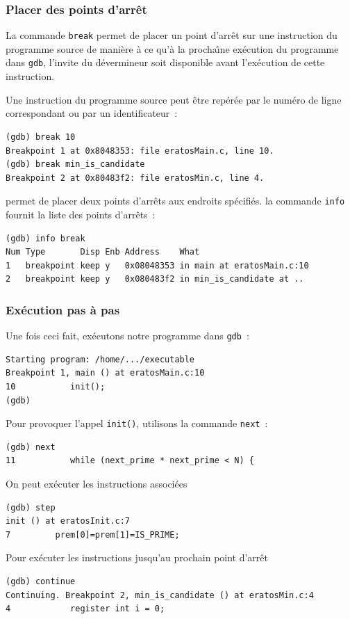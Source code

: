 \begin{frame}[fragile]
  \frametitle{Placer des points d'arr\^et}%
La commande \texttt{break} permet de placer un point d'arr\^et sur une
instruction    du programme source   de   mani\`ere \`a  ce qu'\`a  la
procha\^\i{}ne ex\'ecution du programme dans \texttt{gdb}, l'invite du
d\'evermineur  soit     disponible    avant l'ex\'ecution     de cette
instruction.
\par 
Une instruction du programme source peut \^etre rep\'er\'ee par le
num\'ero de ligne correspondant ou par un identificateur~:
\begin{verbatim}
(gdb) break 10
Breakpoint 1 at 0x8048353: file eratosMain.c, line 10.
(gdb) break min_is_candidate
Breakpoint 2 at 0x80483f2: file eratosMin.c, line 4.
\end{verbatim}
permet de placer deux points d'arr\^ets aux endroits sp\'ecifi\'es. la commande
\texttt{info} fournit la liste des points d'arr\^ets~:
\begin{verbatim}
(gdb) info break
Num Type       Disp Enb Address    What
1   breakpoint keep y   0x08048353 in main at eratosMain.c:10
2   breakpoint keep y   0x080483f2 in min_is_candidate at ..
\end{verbatim}
\end{frame}
\begin{frame}[fragile]
  \frametitle{Ex\'ecution pas \`a pas}%
  Une fois ceci fait, ex\'ecutons notre programme dans \texttt{gdb}~:
\begin{verbatim}
Starting program: /home/.../executable 
Breakpoint 1, main () at eratosMain.c:10
10           init();
(gdb) 
\end{verbatim}
  Pour provoquer l'appel \texttt{init()}, utilisons la commande
  \texttt{next}~:
\begin{verbatim}
(gdb) next
11           while (next_prime * next_prime < N) {
\end{verbatim}
  On peut ex\'ecuter les instructions associ\'ees
\begin{verbatim}
(gdb) step
init () at eratosInit.c:7
7         prem[0]=prem[1]=IS_PRIME;
\end{verbatim}
Pour ex\'ecuter les instructions jusqu'au prochain point
d'arr\^et
\begin{verbatim}
(gdb) continue
Continuing. Breakpoint 2, min_is_candidate () at eratosMin.c:4
4            register int i = 0;
\end{verbatim}
\end{frame}
